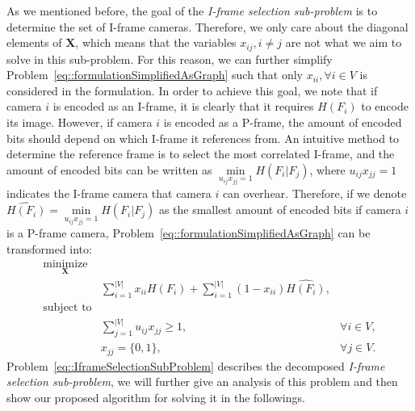 As we mentioned before, the goal of the \emph{I-frame selection sub-problem} is to determine the set of I-frame cameras.
Therefore, we only care about the diagonal elements of $\mathbf{X}$, which means that the variables $x_{ij}, i \neq j$ are not what we aim to solve in this sub-problem.
For this reason, we can further simplify Problem~\eqref{eq::formulationSimplifiedAsGraph} such that only $x_{ii}, \forall i \in V$ is considered in the formulation.
In order to achieve this goal, we note that if camera $i$ is encoded as an I-frame, it is clearly that it requires $H(F_i)$ to encode its image.
However, if camera $i$ is encoded as a P-frame, the amount of encoded bits should depend on which I-frame it references from.
An intuitive method to determine the reference frame is to select the most correlated I-frame, and the amount of encoded bits can be written as $\underset{u_{ij}x_{jj} = 1}{\min} H(F_i|F_j)$, where $u_{ij}x_{jj} = 1$ indicates the I-frame camera that camera $i$ can overhear.
Therefore, if we denote ${\widehat{H(F_i)} = \underset{u_{ij}x_{jj} = 1}{\min} H(F_i|F_j)}$ as the smallest amount of encoded bits if camera $i$ is a P-frame camera, Problem~\eqref{eq::formulationSimplifiedAsGraph} can be transformed into:
\begin{align}
\underset{\mathbf{X}}{\text{minimize}} & & \nonumber \\
	&\sum_{i=1}^{|V|} x_{ii}H(F_i) + \sum_{i=1}^{|V|} (1-x_{ii}) \widehat{H(F_i)}, & \nonumber \\
\text{subject to} & & \nonumber \\
	&\sum_{j=1}^{|V|} u_{ij} x_{jj} \geq 1, &\forall i \in V, \nonumber \\
	&x_{jj} = \{0,1\}, &\forall j \in V.  
\label{eq::IframeSelectionSubProblem}
\end{align}
Problem~\eqref{eq::IframeSelectionSubProblem} describes the decomposed \emph{I-frame selection sub-problem}, we will further give an analysis of this problem and then show our proposed algorithm for solving it in the followings.

%
